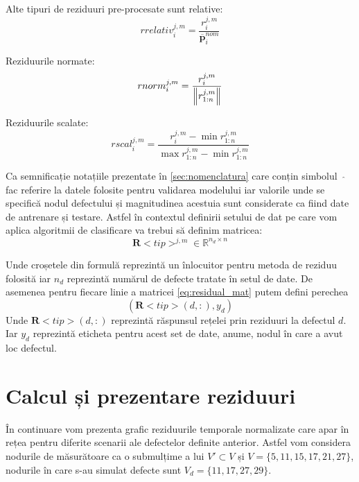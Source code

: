 Alte tipuri de reziduuri pre-procesate sunt relative:
\begin{equation}
rrelativ_i^{j,m} = \frac{r_i^{j,m}}{\overline{\mathbf{p}}_i^{nom}} 
\label{eq:relative_residual}
\end{equation}

Reziduurile normate:
\begin{equation}
rnorm_{i}^{j,m} =  \frac{r_i^{j,m}}{ \left\lVert r_{1:n}^{j,m}\right\rVert} 
\label{eq:norm_residual}
\end{equation}

Reziduurile scalate:
\begin{equation}
rscal_{i}^{j,m} = \frac{r_i^{j,m} - \min r_{1:n}^{j,m}}{ \max r_{1:n}^{j,m} -  \min r_{1:n}^{j,m}}
\label{eq:scaled_residual}
\end{equation}


Ca semnificație notațiile prezentate în \ref{sec:nomenclatura} care conțin simbolul~ $\widehat{}$~ fac referire la datele folosite pentru validarea modelului iar valorile unde se specifică nodul defectului și magnitudinea acestuia sunt considerate ca fiind date de antrenare și testare. Astfel în contextul definirii setului de dat pe care vom aplica algoritmii de clasificare va trebui să definim matricea:
\begin{equation}
\mathbf{R}<tip>^{j, m} \in \mathbb{R}^{n_{d} \times n}
\label{eq:residual_mat}
\end{equation}

Unde croșetele din formulă reprezintă un înlocuitor pentru metoda de reziduu folosită iar $n_{d}$ reprezintă numărul de defecte tratate în setul de date. De asemenea pentru fiecare linie a matricei \eqref{eq:residual_mat} putem defini perechea
\begin{equation}
\left( \mathbf{R}<tip>(d,:), y_{d} \right)
\label{eq:residual_mat_label}
\end{equation} 
Unde $ \mathbf{R}<tip>(d,:)$ reprezintă răspunsul rețelei prin reziduuri la defectul $d$. Iar $y_{d}$ reprezintă eticheta pentru acest set de date, anume, nodul în care a avut loc defectul.

\section{Calcul și prezentare reziduuri}
În continuare vom prezenta grafic reziduurile temporale normalizate care apar în rețea pentru diferite scenarii ale defectelor definite anterior.
Astfel vom considera nodurile de măsurătoare ca o submulțime  a lui $V' \subset V$ și $ V = \{5, 11, 15, 17, 21, 27\}$, nodurile în care s-au simulat defecte sunt $V_{d} = \{11, 17, 27,29\}$.

